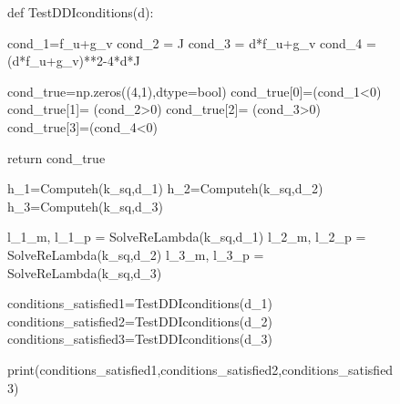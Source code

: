 \documentclass[
  letterpaper,
  DIV=11,
  numbers=noendperiod]{scrreprt}
\newenvironment{Shaded}{\begin{snugshade}}{\end{snugshade}}
\newcommand{\BuiltInTok}[1]{\textcolor[rgb]{0.00,0.23,0.31}{#1}}
\newcommand{\ControlFlowTok}[1]{\textcolor[rgb]{0.00,0.23,0.31}{#1}}
\newcommand{\DecValTok}[1]{\textcolor[rgb]{0.68,0.00,0.00}{#1}}
\newcommand{\KeywordTok}[1]{\textcolor[rgb]{0.00,0.23,0.31}{#1}}
\newcommand{\NormalTok}[1]{\textcolor[rgb]{0.00,0.23,0.31}{#1}}
\newcommand{\OperatorTok}[1]{\textcolor[rgb]{0.37,0.37,0.37}{#1}}
\theoremstyle{plain}
\theoremstyle{definition}
\theoremstyle{plain}
\theoremstyle{remark}
\begin{document}
\begin{figure}
{\begin{Shaded}
\begin{Highlighting}[]
\KeywordTok{def}\NormalTok{ TestDDIconditions(d):}

\NormalTok{    cond\_1}\OperatorTok{=}\NormalTok{f\_u}\OperatorTok{+}\NormalTok{g\_v}
\NormalTok{    cond\_2 }\OperatorTok{=}\NormalTok{ J}
\NormalTok{    cond\_3 }\OperatorTok{=}\NormalTok{ d}\OperatorTok{*}\NormalTok{f\_u}\OperatorTok{+}\NormalTok{g\_v}
\NormalTok{    cond\_4 }\OperatorTok{=}\NormalTok{ (d}\OperatorTok{*}\NormalTok{f\_u}\OperatorTok{+}\NormalTok{g\_v)}\OperatorTok{**}\DecValTok{2}\OperatorTok{{-}}\DecValTok{4}\OperatorTok{*}\NormalTok{d}\OperatorTok{*}\NormalTok{J}

\NormalTok{    cond\_true}\OperatorTok{=}\NormalTok{np.zeros((}\DecValTok{4}\NormalTok{,}\DecValTok{1}\NormalTok{),dtype}\OperatorTok{=}\BuiltInTok{bool}\NormalTok{)}
\NormalTok{    cond\_true[}\DecValTok{0}\NormalTok{]}\OperatorTok{=}\NormalTok{(cond\_1}\OperatorTok{\textless{}}\DecValTok{0}\NormalTok{) }
\NormalTok{    cond\_true[}\DecValTok{1}\NormalTok{]}\OperatorTok{=}\NormalTok{ (cond\_2}\OperatorTok{\textgreater{}}\DecValTok{0}\NormalTok{) }
\NormalTok{    cond\_true[}\DecValTok{2}\NormalTok{]}\OperatorTok{=}\NormalTok{ (cond\_3}\OperatorTok{\textgreater{}}\DecValTok{0}\NormalTok{)}
\NormalTok{    cond\_true[}\DecValTok{3}\NormalTok{]}\OperatorTok{=}\NormalTok{(cond\_4}\OperatorTok{\textless{}}\DecValTok{0}\NormalTok{)}


    \ControlFlowTok{return}\NormalTok{ cond\_true}

\NormalTok{h\_1}\OperatorTok{=}\NormalTok{Computeh(k\_sq,d\_1)}
\NormalTok{h\_2}\OperatorTok{=}\NormalTok{Computeh(k\_sq,d\_2)}
\NormalTok{h\_3}\OperatorTok{=}\NormalTok{Computeh(k\_sq,d\_3)}

\NormalTok{l\_1\_m, l\_1\_p }\OperatorTok{=}\NormalTok{ SolveReLambda(k\_sq,d\_1)}
\NormalTok{l\_2\_m, l\_2\_p }\OperatorTok{=}\NormalTok{ SolveReLambda(k\_sq,d\_2)}
\NormalTok{l\_3\_m, l\_3\_p }\OperatorTok{=}\NormalTok{ SolveReLambda(k\_sq,d\_3)}

\NormalTok{conditions\_satisfied1}\OperatorTok{=}\NormalTok{TestDDIconditions(d\_1)}
\NormalTok{conditions\_satisfied2}\OperatorTok{=}\NormalTok{TestDDIconditions(d\_2)}
\NormalTok{conditions\_satisfied3}\OperatorTok{=}\NormalTok{TestDDIconditions(d\_3)}

\BuiltInTok{print}\NormalTok{(conditions\_satisfied1,conditions\_satisfied2,conditions\_satisfied3)}


\end{Highlighting}
\end{Shaded}}
\end{figure}
\end{document}
